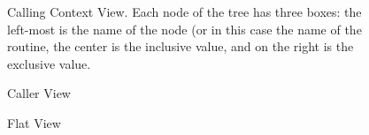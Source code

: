 \begin{figure}[t]
\caption{Calling Context View. Each node of the tree has three boxes: the left-most is the name of the node (or in this case the name of the routine, the center is the inclusive value, and on the right is the exclusive value.}
\label{fig:cct}
\end{figure}

\begin{figure}
\caption{Caller View}
\label{fig:metrics-callers}
\end{figure}

\begin{figure}
\caption{Flat View}
\label{fig:metrics-flat}
\end{figure}


